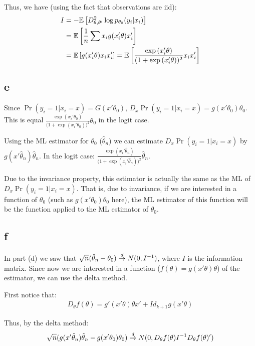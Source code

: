\documentclass[12pt]{paper}
\begin{document}
Thus, we have (using the fact that observations are iid):
\begin{align*}
I&=-\mathbb{E} \left [ D^2_{\theta,\theta'}\log{p_{\theta_0}(y_i|x_i)} \right ]\\
&=\mathbb{E} \left [ \frac{1}{n}\sum{x_ig(x_i'\theta)x'_i} \right ]\\
&=\mathbb{E} \left [ g(x_i'\theta)x_ix'_i \right ]=\mathbb{E} \left [ \frac{\exp{(x_i'\theta)}}{(1+\exp{(x_i'\theta))^2}}x_ix'_i \right ]\\
\end{align*}

\subsection*{e}

Since $\Pr(y_i=1|x_i=x)=G(x'\theta_0)$, $D_x\Pr(y_i=1|x_i=x)=g(x'\theta_0)\theta_0$. This is equal 
$\frac{\exp{(x_i'\theta_0)}}{(1+\exp{(x_i'\theta_0))^2}}\theta_0$ in the logit case.

Using the ML estimator for $\theta_0$ ($\hat{\theta}_n$) we can estimate $D_x\Pr(y_i=1|x_i=x)$ by $g(x'\hat{\theta}_n)\hat{\theta}_n$. In the logit case: $\frac{\exp{(x_i'\hat{\theta}_n)}}{(1+\exp{(x_i'\hat{\theta}_n))^2}}\hat{\theta}_n$.

Due to the invariance property, this estimator is actually the same as the ML of $D_x\Pr(y_i=1|x_i=x)$. That is, due to invariance, if we are interested in a function of $\theta_0$ (such as $g(x'\theta_0)\theta_0$ here), the ML estimator of this function will be the function applied to the ML estimator of $\theta_0$. 

\subsection*{f}

In part (d) we saw that  $\sqrt{n}(\hat{\theta}_n-\theta_0)\overset{d}{\to} N(0,I^{-1})$, where $I$ is the information matrix. Since now we are interested in a function ($f(\theta)=g(x'\theta)\theta$) of the estimator, we can use the delta method. 

First notice that:
\begin{align*}
D_\theta f(\theta)=g'(x'\theta)\theta x'+ Id_{k+1}g(x'\theta)
\end{align*}

Thus, by the delta method:
\begin{align*}
\sqrt{n}(g(x'\hat{\theta}_n)\hat{\theta}_n-g(x'\theta_0)\theta_0)\overset{d}{\to} N(0,D_\theta f(\theta)I^{-1}D_\theta f(\theta)')
\end{align*}
\end{document}
